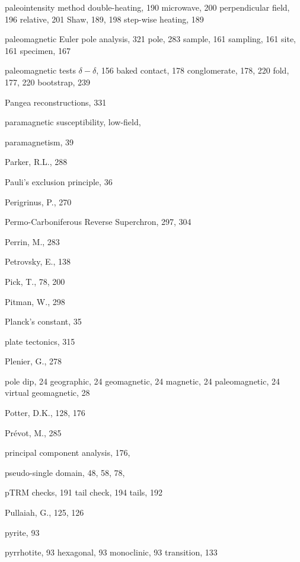\documentclass[,plain]{tauxe}
\begin{document}
\begin{theindex}
  \indexspace

  \item paleointensity method
    \subitem double-heating, 190
    \subitem microwave, 200
    \subitem perpendicular field, 196
    \subitem relative, 201
    \subitem Shaw, 189, 198
    \subitem step-wise heating, 189
  \item paleomagnetic
    \subitem Euler pole analysis, 321
    \subitem pole, 283
    \subitem sample, 161
    \subitem sampling, 161
    \subitem site, 161
    \subitem specimen, 167
  \item paleomagnetic tests
    \subitem $\delta-\delta$, 156
    \subitem baked contact, 178
    \subitem conglomerate, 178, 220
    \subitem fold, 177, 220
      \subsubitem bootstrap, 239
  \item Pangea reconstructions, 331
  \item paramagnetic susceptibility, low-field,
  \item paramagnetism, 39
  \item Parker, R.L., 288
  \item Pauli's exclusion principle, 36
  \item Perigrinus, P., 270
  \item Permo-Carboniferous Reverse Superchron, 297, 304
  \item Perrin, M., 283
  \item Petrovsky, E., 138
  \item Pick, T., 78, 200
  \item Pitman, W., 298
  \item Planck's constant, 35
  \item plate tectonics, 315
  \item Plenier, G., 278
  \item pole
    \subitem dip, 24
    \subitem geographic, 24
    \subitem geomagnetic, 24
    \subitem magnetic, 24
    \subitem paleomagnetic, 24
    \subitem virtual geomagnetic, 28
  \item Potter, D.K., 128, 176
  \item Pr\'evot, M., 285
  \item principal component analysis, 176,
  \item pseudo-single domain, 48, 58, 78,
  \item pTRM
    \subitem checks, 191
    \subitem tail check, 194
    \subitem tails, 192
  \item Pullaiah, G., 125, 126
  \item pyrite, 93
  \item pyrrhotite, 93
    \subitem hexagonal, 93
    \subitem monoclinic, 93
    \subitem transition, 133


\end{theindex}
\end{document}

